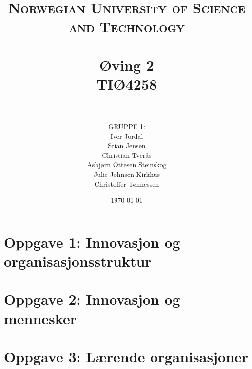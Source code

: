 \documentclass[paper=a4, fontsize=11pt]{scrartcl} %
\title{ 
\normalfont \normalsize 
\textsc{Norwegian University of Science and Technology} \\ [25pt] %
\horrule{0.5pt} \\[0.4cm] %
\huge \textbf{Øving 2} \\ %
TIØ4258 \\
\horrule{2pt} \\[0.5cm] %
}
\author{GRUPPE 1:\\Iver Jordal\\Stian Jensen\\Christian Tverås\\Asbjørn Ottesen Steinskog\\Julie Johnsen Kirkhus\\Christoffer Tønnessen}
\date{\normalsize \today}
\numberwithin{equation}{section} %
\numberwithin{figure}{section} %
\numberwithin{table}{section} %
\begin{document}
\maketitle

\thispagestyle{firststyle}

\setcounter{secnumdepth}{3}


\section{Oppgave 1: Innovasjon og organisasjonsstruktur}

\newpage

\section{Oppgave 2: Innovasjon og mennesker}

\newpage

\section{Oppgave 3: Lærende organisasjoner}

\end{document}
